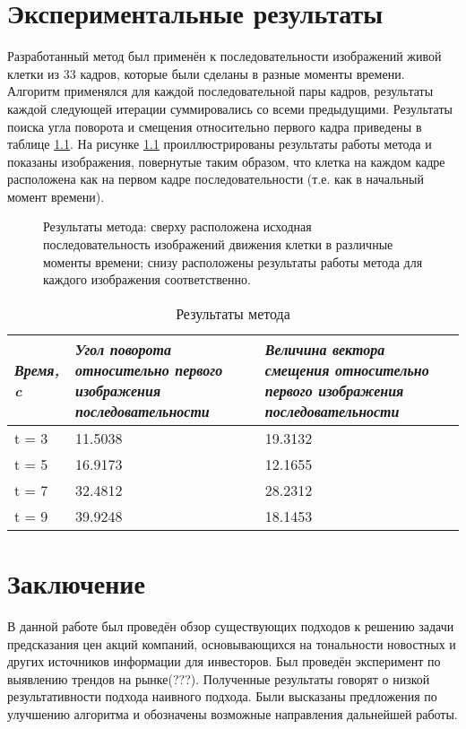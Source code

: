 \documentclass[oneside,final,14pt]{extreport}
\begin{document}
\chapter{Экспериментальные результаты}
Разработанный метод был применён к последовательности изображений живой клетки из 33 кадров, которые были сделаны в разные моменты времени. Алгоритм применялся для каждой последовательной пары кадров, результаты каждой следующей итерации суммировались со всеми предыдущими. Результаты поиска угла поворота и смещения относительно первого кадра приведены в таблице \ref{rtable}.
На рисунке \ref{res}  проиллюстрированы результаты работы метода и показаны изображения, повернутые таким образом, что клетка на каждом кадре расположена как на первом кадре последовательности (т.е. как в начальный момент времени).
\begin{figure}[t]
\centering
\caption{Результаты метода: сверху расположена исходная последовательность изображений движения клетки в различные моменты времени; снизу расположены результаты работы метода для каждого изображения соответственно.}
\label{res}
\end{figure}

 \begin{table}[h]
\centering
\begin{tabular}{| p{} | p{} |  p{}|}
  \hline \emph{Время, c} & \emph{Угол поворота относительно первого изображения последовательности} & \emph{Величина вектора смещения относительно первого изображения последовательности} \\ \hline
  t = 3 & 11.5038 & 19.3132  \\ \hline
  t = 5 & 16.9173 & 12.1655 \\ \hline
  t = 7 & 32.4812 & 28.2312 \\ \hline
  t = 9 & 39.9248 & 18.1453  \\ \hline
\end{tabular}
\caption{ Результаты метода}
\label{rtable}
\end{table}

\chapter{Заключение}
В данной работе был проведён обзор существующих подходов к решению задачи предсказания цен акций компаний,
основывающихся на тональности новостных и других источников информации для инвесторов.
Был проведён эксперимент по выявлению трендов на рынке(???).
Полученные результаты говорят о низкой результативности подхода наивного подхода.
Были высказаны предложения по улучшению алгоритма и обозначены возможные направления дальнейшей работы.

\renewcommand{\bibname}{Список литературы}


\end{document}
